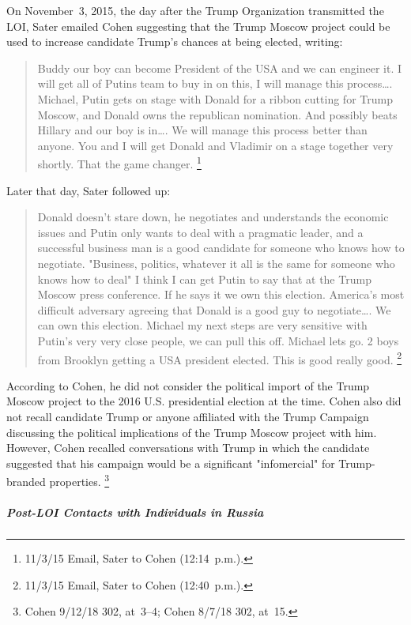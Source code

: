 On November~3, 2015, the day after the Trump Organization transmitted the LOI, Sater emailed Cohen suggesting that the Trump Moscow project could be used to increase candidate Trump's chances at being elected, writing:

\begin{quote}
Buddy our boy can become President of the USA and we can engineer it.
I will get all of Putins team to buy in on this, I will manage this process\dots.
Michael, Putin gets on stage with Donald for a ribbon cutting for Trump Moscow, and Donald owns the republican nomination.
And possibly beats Hillary and our boy is in\dots.
We will manage this process better than anyone.
You and I will get Donald and Vladimir on a stage together very shortly.
That the game changer.%
\footnote{11/3/15 Email, Sater to Cohen (12:14~p.m.).}
\end{quote}

Later that day, Sater followed up:

\begin{quote}
Donald doesn't stare down, he negotiates and understands the economic issues and Putin only wants to deal with a pragmatic leader, and a successful business man is a good candidate for someone who knows how to negotiate.
"Business, politics, whatever it all is the same for someone who knows how to deal"
I think I can get Putin to say that at the Trump Moscow press conference.
If he says it we own this election.
America's most difficult adversary agreeing that Donald is a good guy to negotiate\dots.
We can own this election.
Michael my next steps are very sensitive with Putin's very very close people, we can pull this off.
Michael lets go.
2 boys from Brooklyn getting a USA president elected.
This is good really good.%
\footnote{11/3/15 Email, Sater to Cohen (12:40~p.m.).}
\end{quote}

According to Cohen, he did not consider the political import of the Trump Moscow project to the 2016 U.S. presidential election at the time.
Cohen also did not recall candidate Trump or anyone affiliated with the Trump Campaign discussing the political implications of the Trump Moscow project with him.
However, Cohen recalled conversations with Trump in which the candidate suggested that his campaign would be a significant "infomercial" for Trump-branded properties.%
\footnote{Cohen 9/12/18 302, at~3--4; Cohen 8/7/18 302, at~15.}

\subparagraph{Post-LOI Contacts with Individuals in Russia}

